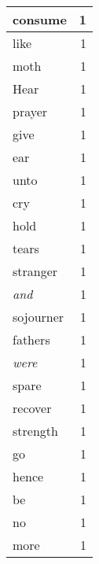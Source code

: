 \begin{center}
\begin{longtable}{l|r}
consume & 1 \\ \hline
like & 1 \\ \hline
moth & 1 \\ \hline
Hear & 1 \\ \hline
prayer & 1 \\ \hline
give & 1 \\ \hline
ear & 1 \\ \hline
unto & 1 \\ \hline
cry & 1 \\ \hline
hold & 1 \\ \hline
tears & 1 \\ \hline
stranger & 1 \\ \hline
\emph{and} & 1 \\ \hline
sojourner & 1 \\ \hline
fathers & 1 \\ \hline
\emph{were} & 1 \\ \hline
spare & 1 \\ \hline
recover & 1 \\ \hline
strength & 1 \\ \hline
go & 1 \\ \hline
hence & 1 \\ \hline
be & 1 \\ \hline
no & 1 \\ \hline
more & 1 \\ \hline
\end{longtable}
\end{center}



\normalsize



